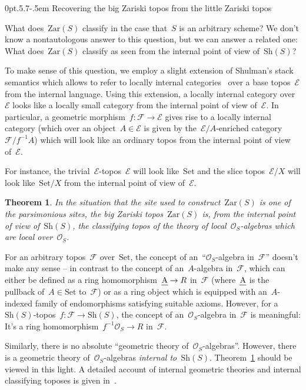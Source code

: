 \documentclass[10pt,reqno,a4paper]{amsbook}
\makeatletter
\theoremstyle{definition}
\theoremstyle{plain}
\newtheorem{thm}[defn]{Theorem}
\theoremstyle{remark}
\newcommand{\E}{\mathcal{E}}
\newcommand{\F}{\mathcal{F}}
\renewcommand{\O}{\mathcal{O}}
\let\oldul\ul
\renewcommand{\ul}[1]{\text{\oldul{$#1$}}}
\newcommand{\Set}{\mathrm{Set}}
\newcommand{\Sh}{\mathrm{Sh}}
\newcommand{\Zar}{\mathrm{Zar}}
\newcommand{\?}{\,{:}\,}
\renewcommand{\_}{\mathpunct{.}\,}
\def\subsection{\@startsection{subsection}{2}%
  {0pt}{.5\linespacing\@plus.7\linespacing}{-.5em}%
  {\normalfont\bfseries}}
\makeatother
\begin{document}
\subsection{Recovering the big Zariski topos from the little Zariski topos}

What does~$\Zar(S)$ classify in the case that~$S$ is an arbitrary scheme?
We don't know a nontautologous answer to this question, but we can answer a
related one: What does~$\Zar(S)$ classify as seen from the internal point of
view of~$\Sh(S)$?

To make sense of this question, we employ a slight extension of Shulman's
stack semantics which allows to refer to locally internal
categories~\cite{penon:locally-internal-categories} over a base topos~$\E$ from
the internal language. Using this extension, a locally internal category
over~$\E$ looks like a locally small category from the internal point of view
of~$\E$. In particular, a geometric morphism~$f : \F \to \E$ gives rise to a
locally internal category (which over an object~$A \in \E$ is given by
the~$\E/A$-enriched category~$\F/f^{-1}A$) which will look like an ordinary
topos from the internal point of view of~$\E$.

For instance, the trivial~$\E$-topos~$\E$ will look like~$\Set$ and the
slice topos~$\E/X$ will look like~$\Set/X$ from the internal point of
view of~$\E$.

\begin{thm}\label{thm:zar-classifies}
In the situation that the site used to construct~$\Zar(S)$ is one of the
parsimonious sites, the big Zariski topos~$\Zar(S)$ is, from the internal point
of view of~$\Sh(S)$, the classifying topos of
the theory of local~$\O_S$-algebras which are local over~$\O_S$.
\end{thm}

For an arbitrary topos~$\F$ over~$\Set$, the concept of an~``$\O_S$-algebra
in~$\F$'' doesn't make any sense -- in contrast to the concept of
an~$A$-algebra in~$\F$, which can either be defined as a ring
homomorphism~$\ul{A} \to R$ in~$\F$ (where~$\ul{A}$ is the pullback of~$A \in
\Set$ to~$\F$) or as a ring object which is equipped with an~$A$-indexed family of
endomorphisms satisfying suitable axioms. However, for a~$\Sh(S)$-topos~$f : \F \to
\Sh(S)$, the concept of an~$\O_S$-algebra in~$\F$ is meaningful: It's a ring
homomorphism~$f^{-1}\O_S \to R$ in~$\F$.

Similarly, there is no absolute ``geometric theory of~$\O_S$-algebras''.
However, there is a geometric theory of~$\O_S$-algebras \emph{internal
to~$\Sh(S)$}. Theorem~\ref{thm:zar-classifies} should be viewed in this light.
A detailed account of internal geometric theories and internal classifying toposes
is given in~\cite[Chapter~II]{henry:classifying-topoi}.
\end{document}
